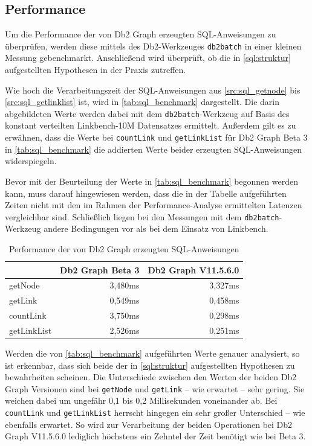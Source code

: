 \subsection{Performance}
\label{sql:performance}
Um die Performance der von Db2 Graph erzeugten SQL-Anweisungen zu überprüfen, werden diese mittels des Db2-Werkzeuges \texttt{db2batch} in einer kleinen Messung gebenchmarkt. Anschließend wird überprüft, ob die in \autoref{sql:struktur} aufgestellten Hypothesen in der Praxis zutreffen.

Wie hoch die Verarbeitungszeit der SQL-Anweisungen aus \autoref{src:sql_getnode} bis \autoref{src:sql_getlinklist} ist, wird in \autoref{tab:sql_benchmark} dargestellt. Die darin abgebildeten Werte werden dabei mit dem \texttt{db2batch}-Werkzeug auf Basis des konstant verteilten Linkbench-10M Datensatzes ermittelt.  Außerdem gilt es zu erwähnen, dass die Werte bei \texttt{countLink} und \texttt{getLinkList} für Db2 Graph Beta 3 in \autoref{tab:sql_benchmark} die addierten Werte beider erzeugten SQL-Anweisungen widerspiegeln. 

Bevor mit der Beurteilung der Werte in \autoref{tab:sql_benchmark} begonnen werden kann, muss darauf hingewiesen werden, dass die in der Tabelle aufgeführten Zeiten nicht mit den im Rahmen der Performance-Analyse ermittelten Latenzen vergleichbar sind. Schließlich liegen bei den Messungen mit dem \texttt{db2batch}-Werkzeug andere Bedingungen vor als bei dem Einsatz von Linkbench. 

\begin{table}[!ht]
    \centering
    \begin{tabular}{l|r|r}
    \hline
    \rowcolor[HTML]{EFEFEF} 
    \multicolumn{1}{c|}{\cellcolor[HTML]{EFEFEF}{\color[HTML]{333333} \textbf{SQL-Anweisung}}} & \multicolumn{1}{c|}{\cellcolor[HTML]{EFEFEF}\textbf{Db2 Graph Beta 3}} & \multicolumn{1}{c}{\cellcolor[HTML]{EFEFEF}\textbf{Db2 Graph V11.5.6.0}} \\ \hline
    getNode & 3,480ms & 3,327ms \\
    getLink & 0,549ms & 0,458ms \\
    countLink & 3,750ms & 0,298ms \\
    getLinkList & 2,526ms & 0,251ms \\ \hline
    \end{tabular}
    \caption{Performance der von Db2 Graph erzeugten SQL-Anweisungen}
    \label{tab:sql_benchmark}
\end{table}

Werden die von \autoref{tab:sql_benchmark} aufgeführten Werte genauer analysiert, so ist erkennbar, dass sich beide der in \autoref{sql:struktur} aufgestellten Hypothesen zu bewahrheiten scheinen. Die Unterschiede zwischen den Werten der beiden Db2 Graph Versionen sind bei \texttt{getNode} und \texttt{getLink} -- wie erwartet -- sehr gering. Sie weichen dabei um ungefähr 0,1 bis 0,2 Millisekunden voneinander ab. Bei \texttt{countLink} und \texttt{getLinkList} herrscht hingegen ein sehr großer Unterschied -- wie ebenfalls erwartet. So wird zur Verarbeitung der beiden Operationen bei Db2 Graph V11.5.6.0 lediglich höchstens ein Zehntel der Zeit benötigt wie bei Beta 3. 

